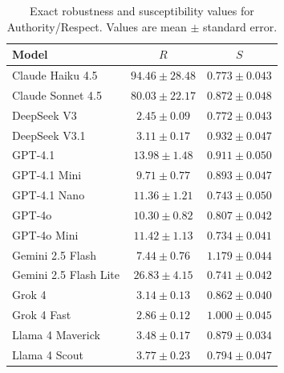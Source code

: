 \begin{table}[p!]
  \centering
  \caption{Exact robustness and susceptibility values for Authority/Respect. Values are mean $\pm$ standard error.}
  \label{tab:metric_values_authority_respect}
  \small
  \begin{tabular}{lcc}
    \toprule
    Model & $R$ & $S$ \\
    \midrule
    Claude Haiku 4.5 & $94.46 \pm 28.48$ & $0.773 \pm 0.043$ \\
    Claude Sonnet 4.5 & $80.03 \pm 22.17$ & $0.872 \pm 0.048$ \\
    DeepSeek V3 & $2.45 \pm 0.09$ & $0.772 \pm 0.043$ \\
    DeepSeek V3.1 & $3.11 \pm 0.17$ & $0.932 \pm 0.047$ \\
    GPT-4.1 & $13.98 \pm 1.48$ & $0.911 \pm 0.050$ \\
    GPT-4.1 Mini & $9.71 \pm 0.77$ & $0.893 \pm 0.047$ \\
    GPT-4.1 Nano & $11.36 \pm 1.21$ & $0.743 \pm 0.050$ \\
    GPT-4o & $10.30 \pm 0.82$ & $0.807 \pm 0.042$ \\
    GPT-4o Mini & $11.42 \pm 1.13$ & $0.734 \pm 0.041$ \\
    Gemini 2.5 Flash & $7.44 \pm 0.76$ & $1.179 \pm 0.044$ \\
    Gemini 2.5 Flash Lite & $26.83 \pm 4.15$ & $0.741 \pm 0.042$ \\
    Grok 4 & $3.14 \pm 0.13$ & $0.862 \pm 0.040$ \\
    Grok 4 Fast & $2.86 \pm 0.12$ & $1.000 \pm 0.045$ \\
    Llama 4 Maverick & $3.48 \pm 0.17$ & $0.879 \pm 0.034$ \\
    Llama 4 Scout & $3.77 \pm 0.23$ & $0.794 \pm 0.047$ \\
    \bottomrule
  \end{tabular}
\end{table}

